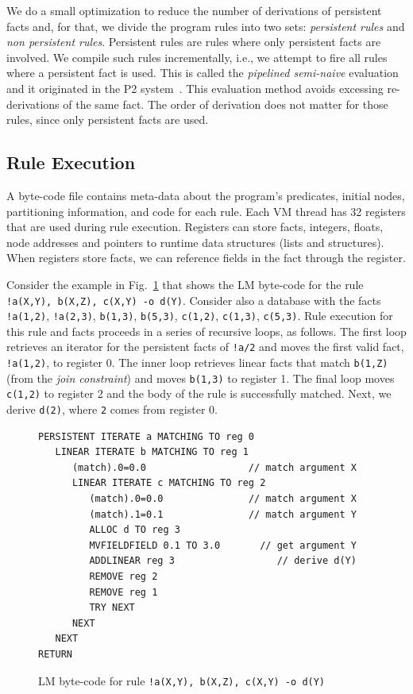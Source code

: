 \documentclass{sigplanconf}
\begin{document}
We do a small optimization to reduce the number of derivations of
persistent facts and, for that, we divide the program rules into two
sets: \emph{persistent rules} and \emph{non persistent rules}.
Persistent rules are rules where only persistent facts are
involved. We compile such rules incrementally, i.e., we attempt to
fire all rules where a persistent fact is used. This is called
the \emph{pipelined semi-naive} evaluation and it originated in the P2
system~\cite{Loo-condie-garofalakis-p2}. This evaluation method avoids
excessing re-derivations of the same fact. The order of derivation
does not matter for those rules, since only persistent facts are used.


\subsection{Rule Execution}

A byte-code file contains meta-data about the program's predicates,
initial nodes, partitioning information, and code for each rule. Each
VM thread has 32 registers that are used during rule
execution. Registers can store facts, integers, floats, node addresses
and pointers to runtime data structures (lists and structures). When
registers store facts, we can reference fields in the fact through the
register.

Consider the example in Fig.~\ref{fig:byte_code} that shows the LM
byte-code for the rule \texttt{!a(X,Y), b(X,Z), c(X,Y) -o
d(Y)}. Consider also a database with the
facts \texttt{!a(1,2)}, \texttt{!a(2,3)}, \texttt{b(1,3)},
\texttt{b(5,3)}, \texttt{c(1,2)}, \texttt{c(1,3)}, \texttt{c(5,3)}. Rule
execution for this rule and facts proceeds in a series of recursive
loops, as follows. The first loop retrieves an iterator for the
persistent facts of \texttt{!a/2} and moves the first valid
fact, \texttt{!a(1,2)}, to register 0. The inner loop retrieves linear
facts that match \texttt{b(1,Z)} (from the
\emph{join constraint}) and moves \texttt{b(1,3)} to register 1. The 
final loop moves \texttt{c(1,2)} to register 2 and the body of the
rule is successfully matched. Next, we derive \texttt{d(2)},
where \texttt{2} comes from register 0.

\begin{figure}[ht]
{\footnotesize
\begin{Verbatim}
PERSISTENT ITERATE a MATCHING TO reg 0
   LINEAR ITERATE b MATCHING TO reg 1
      (match).0=0.0                  // match argument X
      LINEAR ITERATE c MATCHING TO reg 2
         (match).0=0.0               // match argument X
         (match).1=0.1               // match argument Y
         ALLOC d TO reg 3
         MVFIELDFIELD 0.1 TO 3.0       // get argument Y
         ADDLINEAR reg 3                  // derive d(Y)
         REMOVE reg 2
         REMOVE reg 1
         TRY NEXT
      NEXT
   NEXT
RETURN
\end{Verbatim}
}
\caption{LM byte-code for rule \texttt{!a(X,Y), b(X,Z), c(X,Y) -o d(Y)}}
\label{fig:byte_code}
\end{figure}
\end{document}
